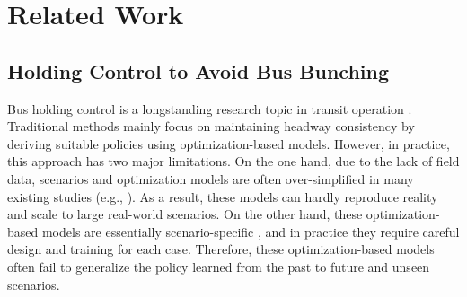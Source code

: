 \documentclass{article}
\begin{document}
\section{Related Work}

\subsection{Holding Control to Avoid Bus Bunching}
Bus holding control is a longstanding research topic in transit operation \cite{daganzo2019public}. Traditional methods mainly focus on maintaining headway consistency by deriving suitable policies using optimization-based models. However, in practice, this approach has two major limitations. On the one hand, due to the lack of field data, scenarios and optimization models are often over-simplified in many existing studies (e.g.,  \cite{daganzo2009headway,wang2020dynamic}). As a result, these models can hardly reproduce reality and scale to large real-world scenarios. On the other hand, these optimization-based models are essentially scenario-specific \cite{seman2019headway}, and in practice they require careful design and training for each case. Therefore, these optimization-based models often fail to generalize the policy learned from the past to future and unseen scenarios.
\end{document}

